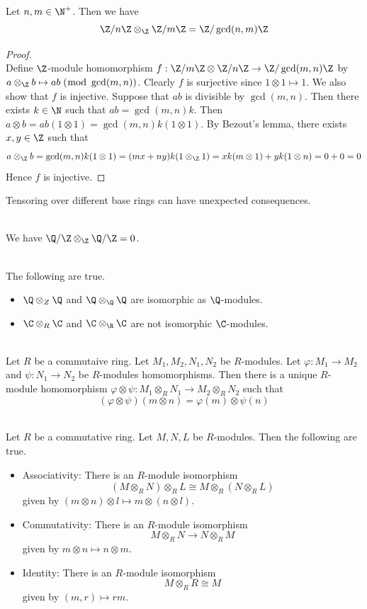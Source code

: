 \documentclass[a4paper]{article}
\begin{document}
\begin{eg}{}{}\\
Let $n,m\in\N^+$. Then we have $$\Z/n\Z\otimes_\Z\Z/m\Z=\Z/\gcd(n,m)\Z$$
\begin{proof}\\
Define $\Z$-module homomorphism $f:\Z/m\Z\otimes\Z/n\Z\to\Z/\gcd(m,n)\Z$ by $a\otimes_\Z b\mapsto ab\;(\bmod\;\gcd(m,n))$. Clearly $f$ is surjective since $1\otimes 1\mapsto 1$. We also show that $f$ is injective. Suppose that $ab$ is divisible by $\gcd(m,n)$. Then there exists $k\in\N$ such that $ab=\gcd(m,n)k$. Then $a\otimes b=ab(1\otimes 1)=\gcd(m,n)k(1\otimes 1)$. By Bezout's lemma, there exists $x,y\in\Z$ such that $$a\otimes_\Z b=\gcd(m,n)k(1\otimes 1)=(mx+ny)k(1\otimes_\Z1)=xk(m\otimes 1)+yk(1\otimes n)=0+0=0$$ Hence $f$ is injective. 
\end{proof}
\end{eg}

Tensoring over different base rings can have unexpected consequences. 

\begin{eg}{}{}\\
We have $\Q/\Z\otimes_\Z\Q/\Z=0$. 
\end{eg}

\begin{eg}{}{}\\
The following are true. 
\begin{itemize}
\item $\Q\otimes_Z\Q$ and $\Q\otimes_\Q\Q$ are isomorphic as $\Q$-modules. 
\item $\C\otimes_R\C$ and $\C\otimes_\R\C$ are not isomorphic $\C$-modules. 
\end{itemize}
\end{eg}

\begin{prp}{}{}\\
Let $R$ be a commutaive ring. Let $M_1,M_2,N_1,N_2$ be $R$-modules. Let $\varphi:M_1\to M_2$ and $\psi:N_1\to N_2$ be $R$-modules homomorphisms. Then there is a unique $R$-module homomorphism $\varphi\otimes\psi:M_1\otimes_RN_1\to M_2\otimes_RN_2$ such that $$(\varphi\otimes\psi)(m\otimes n)=\varphi(m)\otimes\psi(n)$$
\end{prp}

\begin{prp}{}{}\\
Let $R$ be a commutative ring. Let $M,N,L$ be $R$-modules. Then the following are true. 
\begin{itemize}
\item Associativity: There is an $R$-module isomorphism $$(M\otimes_RN)\otimes_RL\cong M\otimes_R(N\otimes_RL)$$ given by $(m\otimes n)\otimes l\mapsto m\otimes(n\otimes l)$. 
\item Commutativity: There is an $R$-module isomorphism $$M\otimes_RN\to N\otimes_RM$$ given by $m\otimes n\mapsto n\otimes m$. 
\item Identity: There is an $R$-module isomorphism $$M\otimes_RR\cong M$$ given by $(m,r)\mapsto rm$. 
\end{itemize}
\end{prp}
\end{document}
